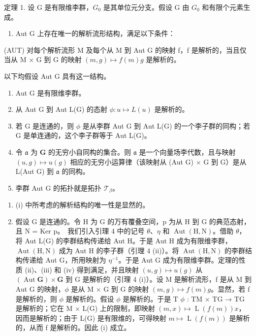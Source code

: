 定理 1. 设 G 是有限维李群，\(G_{0}\) 是其单位元分支。假设 G 由 \(G_{0}\) 和有限个元素生成。

\begin{enumerate}
\def\labelenumi{(\roman{enumi})}
\tightlist
\item
  Aut G 上存在唯一的解析流形结构，满足以下条件：
\end{enumerate}

(AUT) 对每个解析流形 M 及每个从 M 到 Aut G 的映射 f，f 是解析的，当且仅当从 M × G 到 G 的映射 \((m, g) \mapsto f(m)g\) 是解析的。

以下均假设 Aut G 具有这一结构。

\begin{enumerate}
\def\labelenumi{(\roman{enumi})}
\setcounter{enumi}{1}
\item
  Aut G 是有限维李群。
\item
  从 Aut G 到 Aut L(G) 的态射 \(\phi: u \mapsto L(u)\) 是解析的。
\item
  若 G 是连通的，则 \(\phi\) 是从李群 Aut G 到 Aut L(G) 的一个李子群的同构；若 G 是单连通的，这个李子群等于 Aut L(G)。
\item
  令 \(\mathfrak{a}\) 为 \(\mathbf{G}\) 的无穷小自同构的集合。则 \(\mathfrak{a}\) 是一个向量场李代数，且与映射 \((u, g) \mapsto u(g)\) 相应的无穷小运算律（该映射从 (Aut G) \(\times\) G 到 G）是从 L(Aut G) 到 \(\mathfrak{a}\) 的同构。
\item
  李群 Aut G 的拓扑就是拓扑 \(\mathcal{T}_{\beta}\)。
\end{enumerate}

\begin{enumerate}
\def\labelenumi{(\alph{enumi})}
\item
  (i) 中所考虑的解析结构的唯一性是显然的。
\item
  假设 G 是连通的。令 H 为 G 的万有覆叠空间，p 为从 H 到 G 的典范态射，且 N = Ker p。~我们引入引理 4 中的记号 \(\theta\)、\(\eta\) 和 \(\operatorname{Aut}(\mathrm{H},\mathrm{N})\)。借助 \(\theta\)，将 Aut L(G) 的李群结构传递给 Aut H。于是 Aut H 成为有限维李群，\(\operatorname{Aut}(\mathrm{H},\mathrm{N})\) 成为 Aut H 的李子群（引理 4 (ii)）。将 \(\operatorname{Aut}(\mathrm{H},\mathrm{N})\) 的李群结构传递给 Aut G，所用映射为 \(\eta^{-1}\)。于是 Aut G 成为有限维李群。定理的性质 (ii)、(iii) 和 (iv) 得到满足，并且映射 \((u,g)\mapsto u(g)\) 从 \((\operatorname{Aut}\mathbf{G})\times\mathbf{G}\) 到 G 是解析的（引理 4 (i)）。设 M 是解析流形，f 是从 M 到 Aut G 的映射，\(\phi\) 是从 M × G 到 G 的映射 \((m,g)\mapsto f(m)g\)。显然，若 f 是解析的，则 \(\phi\) 是解析的。假设 \(\phi\) 是解析的。于是 T \(\phi\) : TM × TG → TG 是解析的；它在 M × L(G) 上的限制，即映射 \((m,x)\mapsto\operatorname{L}(f(m))x\)，因而是解析的；由于 L(G) 是有限维的，可得映射 \(m\mapsto\operatorname{L}(f(m))\) 是解析的，从而 f 是解析的。因此 (i) 成立。
\end{enumerate}

